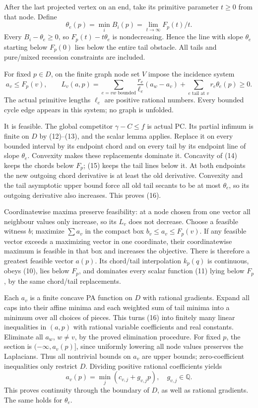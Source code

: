 \documentclass[
  11pt,
]{article}
\begin{document}
After the last projected vertex on an end, take its primitive parameter
\(t\geq0\) from that node. Define \[
 \theta_e(p)=\min_iB_i(p)=\lim_{t\to\infty}F_p(t)/t.          \tag{15}
\] Every \(B_i-\theta_e\geq0\), so \(F_p(t)-t\theta_e\) is
nondecreasing. Hence the line with slope \(\theta_e\) starting below
\(F_p(0)\) lies below the entire tail obstacle. All tails and pure/mixed
recession constraints are included.

For fixed \(p\in D\), on the finite graph node set \(V\) impose the
incidence system \[
 a_v\leq F_p(v),\qquad
 L_v(a,p)=\sum_{e=vw\text{ bounded}}\frac{r_e}{\ell_e}(a_w-a_v)
              +\sum_{e\text{ tail at }v}r_e\theta_e(p)\geq0.             \tag{16}
\] The actual primitive lengths \(\ell_e\) are positive rational
numbers. Every bounded cycle edge appears in this system; no graph is
unfolded.

It is feasible. The global competitor \(\gamma-C\leq f\) is actual PC.
Its partial infimum is finite on \(D\) by (12)--(13), and the scalar
lemma applies. Replace it on every bounded interval by its endpoint
chord and on every tail by its endpoint line of slope \(\theta_e\).
Convexity makes these replacements dominate it. Concavity of (14) keeps
the chords below \(F_p\); (15) keeps the tail lines below it. At both
endpoints the new outgoing chord derivative is at least the old
derivative. Convexity and the tail asymptotic upper bound force all old
tail secants to be at most \(\theta_e\), so its outgoing derivative also
increases. This proves (16).

Coordinatewise maxima preserve feasibility: at a node chosen from one
vector all neighbour values only increase, so its \(L_v\) does not
decrease. Choose a feasible witness \(b\); maximize \(\sum a_v\) in the
compact box \(b_v\leq a_v\leq F_p(v)\). If any feasible vector exceeds a
maximizing vector in one coordinate, their coordinatewise maximum is
feasible in that box and increases the objective. There is therefore a
greatest feasible vector \(a(p)\). Its chord/tail interpolation
\(k_p(q)\) is continuous, obeys (10), lies below \(F_p\), and dominates
every scalar function (11) lying below \(F_p\), by the same chord/tail
replacements.

Each \(a_v\) is a finite concave PA function on \(D\) with rational
gradients. Expand all caps into their affine minima and each weighted
sum of tail minima into a minimum over all choices of pieces. This turns
(16) into finitely many linear inequalities in \((a,p)\) with rational
variable coefficients and real constants. Eliminate all \(a_w\),
\(w\ne v\), by the proved elimination procedure. For fixed \(p\), the
section is \((-\infty,a_v(p)]\), since uniformly lowering all node
values preserves the Laplacians. Thus all nontrivial bounds on \(a_v\)
are upper bounds; zero-coefficient inequalities only restrict \(D\).
Dividing positive rational coefficients yields \[
                       a_v(p)=\min_j(c_{v,j}+g_{v,j}p),\quad
                       g_{v,j}\in\mathbb Q.                 \tag{17}
\] This proves continuity through the boundary of \(D\), as well as
rational gradients. The same holds for \(\theta_e\).
\end{document}
